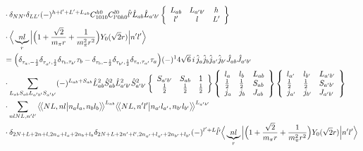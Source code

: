 \documentclass[master]{shnuthesis}
\newcommand{\llangle}{\big\langle\!\big\langle}
\newcommand{\rrangle}{\big\rangle\!\big\rangle}
\newcommand{\ap}{a^\prime}
\newcommand{\bp}{b^\prime}
\begin{document}
$$\begin{align}
    & \cdot \delta_{NN^\prime}\delta_{LL^\prime}(-)^{h+l^\prime+L^\prime+L_{ab}}C_{1010}^{h0}C_{l^\prime 0 h 0}^{l0} \hat{l^\prime}\hat{L}_{ab}\hat{L}_{\ap\bp}  \left\{\begin{array}{ccc} L_{ab} & L_{\ap\bp} & h \\ l^\prime & l & L^\prime \end{array}\right\}  \notag\\
    & \cdot \Big\langle \underbrace{n l}_{r} \Big| \Big(1+\frac{\sqrt{2}}{m_\pi r}+\frac{1}{m_\pi^2 r^2}\Big) Y_0(\sqrt{2}r) \Big| n^\prime l^\prime \Big\rangle \\
    & = \Big( \delta_{\tau_a,-\frac{1}{2}}\delta_{\tau_{\ap},\frac{1}{2}}\delta_{\tau_b,\tau_{\bp}}\tau_b - \delta_{\tau_b,-\frac{1}{2}}\delta_{\tau_{\bp},\frac{1}{2}}\delta_{\tau_a,\tau_{\ap}}\tau_a \Big) (-)^{1} 4\sqrt{6}\,i\,\hat{j}_a\hat{j}_b\hat{j}_{\ap}\hat{j}_{\bp} \hat{J}_{ab}\hat{J}_{\ap\bp}  \notag \\
    & \cdot \sum_{L_{ab}S_{ab}L_{\ap\bp}S_{\ap\bp}} (-)^{L_{ab}+S_{ab}} \hat{L}_{ab}^2\hat{S}_{ab}^2\hat{L}_{\ap\bp}^2\hat{S}_{\ap\bp}^2  \left\{\begin{array}{ccc} S_{\ap\bp} & S_{ab} & 1 \\ \frac{1}{2} & \frac{1}{2} & \frac{1}{2} \end{array}\right\}  \left\{\begin{array}{lll}l_{a} & l_{b} & L_{ab} \\ \frac{1}{2} & \frac{1}{2} & S_{ab} \\j_{a} & j_{b} & J_{ab} \end{array}\right\} \left\{\begin{array}{lll}l_{\ap} & l_{\bp} & L_{\ap\bp} \\ \frac{1}{2} & \frac{1}{2} & S_{\ap\bp} \\j_{\ap} & j_{\bp} & J_{\ap\bp} \end{array}\right\}  \notag\\
    & \cdot \sum_{nlNL,n^\prime l^\prime} \llangle N L, n l \big| n_{a} l_{a}, n_{b} l_{b} \rrangle^{L_{ab}} \llangle N L, n^\prime l^\prime \big| n_{a^\prime} l_{a^\prime}, n_{b^\prime} l_{b^\prime} \rrangle^{L_{\ap\bp}} \notag\\
    & \cdot \delta_{2N+L+2n+l,2n_a+l_a+2n_b+l_b}\delta_{2N+L+2n^\prime+l^\prime,2n_{a^\prime}+l_{a^\prime}+2n_{b^\prime}+l_{b^\prime}} (-)^{l^\prime+L}\hat{l^\prime} \Big\langle \underbrace{n l}_{r} \Big| \Big(1+\frac{\sqrt{2}}{m_\pi r}+\frac{1}{m_\pi^2 r^2}\Big) Y_0(\sqrt{2}r) \Big| n^\prime l^\prime \Big\rangle  \notag\\

\end{align}$$
\end{document}
